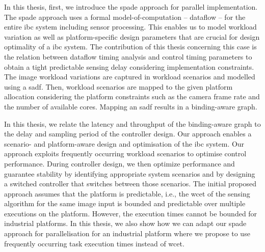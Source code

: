 In this thesis, first, we introduce the \gls{spade} approach for parallel implementation. The \gls{spade} approach uses a formal model-of-computation -- dataflow -- for the entire \gls{ibc} system including sensor processing. This enables us to model workload variation as well as platform-specific design parameters that are crucial for design optimality of a \gls{ibc} system. The contribution of this thesis concerning this case is the relation between dataflow timing analysis and control timing parameters to obtain a tight predictable sensing delay considering implementation constraints.
The image workload variations are captured in workload scenarios and modelled using a \gls{sadf}. 
Then, workload scenarios are mapped to the given platform allocation considering the platform constraints such as the camera frame rate and the number of available cores.
Mapping an \gls{sadf} results in a binding-aware graph. 

In this thesis, we relate the latency and throughput of the binding-aware graph to the delay and sampling period of the controller design. Our approach enables a scenario- and platform-aware design and optimisation of the \gls{ibc} system.
Our approach exploits frequently occurring workload scenarios to optimise control performance.
During controller design, we then optimize performance and guarantee stability by identifying appropriate system scenarios and by designing a switched controller that switches between those scenarios.
The initial proposed approach assumes that the platform is predictable, i.e., the \gls{wcet} of the sensing algorithm for the same image input is bounded and predictable over multiple executions on the platform. 
However, the execution times cannot be bounded for industrial platforms. 
In this thesis, we also show how we can adapt our \gls{spade} approach for parallelisation for an industrial platform where we propose to use frequently occurring task execution times instead of \gls{wcet}.

